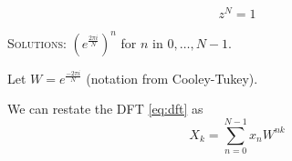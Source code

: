 \documentclass[14pt]{beamer}
\begin{document}
\begin{frame}
    \begin{equation*}
        z^N = 1
    \end{equation*}

    \begin{figure}
        \centering
        
    \end{figure}
    \centering

    \textsc{Solutions}: $\left(\!e^\frac {2\pi i}{N}\right)^{\!\!n}$ for $n$ in $0, \dots, N-1$.
\end{frame}


%         


\begin{frame}
    Let $W = e^\frac{-2 \pi i} N$ (notation from Cooley-Tukey).

    \begin{figure}
        \centering
        
    \end{figure}

    We can restate the DFT \eqref{eq:dft} as
    \begin{equation}
        X_k = \sum_{n=0}^{N-1} x_n W^{nk}
        \label{eq:dftw}
    \end{equation}
\end{frame}
\end{document}
